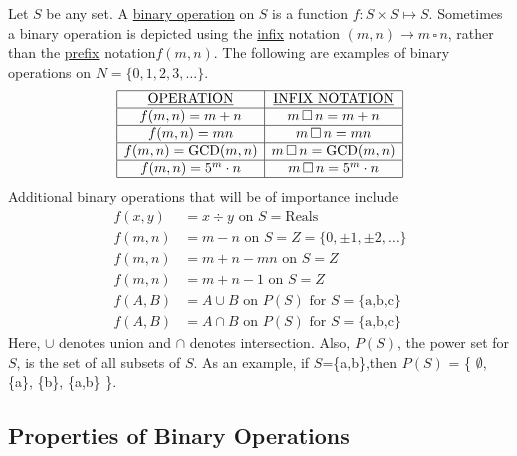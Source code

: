 \documentclass[12pt]{book}
\theoremstyle{definition}
\begin{document}
Let $S$ be any set.  A \underline{binary operation} on $S$ is  a function $f:S\times S\mapsto S$.  Sometimes a binary operation is depicted using the \underline{infix} notation $(m,n)\rightarrow m\,\square\, n$, rather than the \underline{prefix} notation$f(m,n)$.  The following are examples of binary operations on $N=\{0,1,2,3,\dots\}$.\\
$$\begin{array}{|c|c|}
\hline
\underline{\text{OPERATION}}&\underline{\text{INFIX NOTATION}}\\
\hline
f(m,n)=m+n & m\,\square\, n=m+n\\
\hline
f(m,n)=mn & m\,\square\, n=mn\\
\hline
f(m,n)=\text{GCD}(m,n) & m\,\square\, n=\text{GCD}(m,n)\\
\hline
f(m,n)=5^m\cdot n & m\,\square\, n=5^m\cdot n\\
\hline
\end{array}$$
Additional binary operations that will be of importance include
\begin{equation*}\begin{split}
f(x,y)&= x\div y \text{ on }S=\text{Reals}\\
f(m,n)& = m-n \text{ on } S=Z=\{0,\pm1,\pm2,\dots\}\\
f(m,n)&=m+n-mn \text{ on }S=Z\\
f(m,n)&=m+n-1 \text{ on }S=Z\\
f(A,B)&=A\cup B \text{ on } P(S) \text{ for }S=\{\text{a,b,c}\}\\
f(A,B)&=A\cap B \text{ on } P(S) \text{ for }S=\{\text{a,b,c}\}
\end{split}\end{equation*}
Here, $\cup$ denotes union and $\cap$ denotes intersection.  Also, $P(S)$, the power set for $S$, is the set of all subsets of $S$.  As an example, if $S$=\{a,b\},then $P(S)$ = \{ $\emptyset$, \{a\}, \{b\}, \{a,b\} \}.\\[.1in]

\subsection{Properties of Binary Operations}
\end{document}

